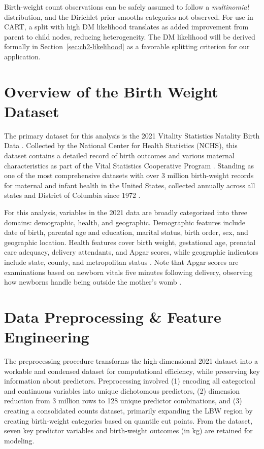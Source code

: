 Birth-weight count observations can be safely assumed to follow a \emph{multinomial} distribution, and the Dirichlet prior smooths categories not observed. For use in CART, a split with high DM likelihood translates as added improvement from parent to child nodes, reducing heterogeneity. The DM likelihood will be derived formally in Section~\ref{sec:ch2-likelihood} as a favorable splitting criterion for our application.

\section{Overview of the Birth Weight Dataset}
\label{sec:ch2-introduction}

The primary dataset for this analysis is the 2021 Vitality Statistics Natality Birth Data \parencite{nber_birth_data}. Collected by the National Center for Health Statistics (NCHS), this dataset contains a detailed record of birth outcomes and various maternal characteristics as part of the Vital Statistics Cooperative Program \parencite{jain2024, nber_birth_data}. Standing as one of the most comprehensive datasets with over 3 million birth-weight records for maternal and infant health in the United States, collected annually across all states and District of Columbia since 1972 \parencite{nber_birth_data}.

For this analysis, variables in the 2021 data are broadly categorized into three domains: demographic, health, and geographic. Demographic features include date of birth, parental age and education, marital status, birth order, sex, and geographic location. Health features cover birth weight, gestational age, prenatal care adequacy, delivery attendants, and Apgar scores, while geographic indicators include state, county, and metropolitan  status \parencite{nber_birth_data}. Note that Apgar scores are examinations based on newborn vitals five minutes following delivery, observing how newborns handle being outside the mother's womb \parencite{apgar_score}.

\section{Data Preprocessing \& Feature Engineering}
\label{sec:ch2-preprocessing}

The preprocessing procedure transforms the high-dimensional 2021 dataset into a workable and condensed dataset for computational efficiency, while preserving key information about predictors. Preprocessing involved (1) encoding all categorical and continuous variables into unique dichotomous predictors, (2) dimension reduction from 3 million rows to 128 unique predictor combinations, and (3) creating a consolidated counts dataset, primarily expanding the LBW region by creating birth-weight categories based on quantile cut points. From the dataset, seven key predictor variables and birth-weight outcomes (in kg) are retained for modeling. 

